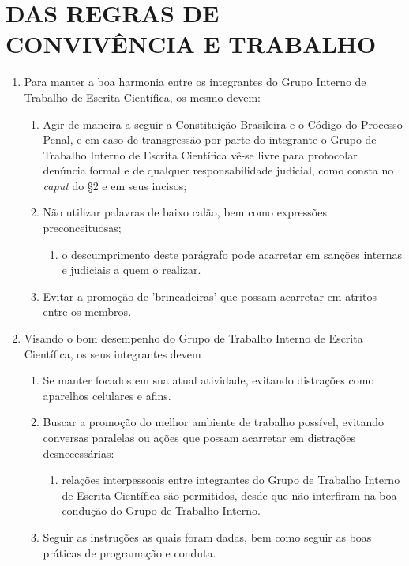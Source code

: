 \chapter{DAS REGRAS DE CONVIVÊNCIA E TRABALHO}

\begin{enumerate}[resume, label=Art. \arabic*] %

\item Para manter a boa harmonia entre os integrantes do Grupo Interno de Trabalho de Escrita Científica, os mesmo devem:

\begin{enumerate}[label= \S \arabic*]
    \item Agir de maneira a seguir a Constituição Brasileira e o Código do Processo Penal, e em caso de transgressão por parte do integrante o Grupo de Trabalho Interno de Escrita Científica vê-se livre para protocolar denúncia formal e de qualquer responsabilidade judicial, como consta no \textit{caput} do §2 e em seus incisos;
    
    \item Não utilizar palavras de baixo calão, bem como expressões preconceituosas;
        
        \begin{enumerate}[label=  \roman*.]
        \item o descumprimento deste parágrafo pode acarretar em sanções internas e judiciais a quem o realizar.
        \end{enumerate}
        
    \item Evitar a promoção de 'brincadeiras' que possam acarretar em atritos entre os membros.
\end{enumerate}

\item Visando o bom desempenho do Grupo de Trabalho Interno de Escrita Científica, os seus integrantes devem

\begin{enumerate}[label= \S \arabic*] %

\item Se manter focados em sua atual atividade, evitando distrações como aparelhos celulares e afins.

\item Buscar a promoção do melhor ambiente de trabalho possível, evitando conversas paralelas ou ações que possam acarretar em distrações desnecessárias:

    \begin{enumerate}[label= \roman*.]
        \item relações interpessoais entre integrantes do Grupo de Trabalho Interno de Escrita Científica são permitidos, desde que não interfiram na boa condução do Grupo de Trabalho Interno.
    \end{enumerate}
    
\item Seguir as instruções as quais foram dadas, bem como seguir as boas práticas de programação e conduta.


\end{enumerate}


\end{enumerate}








